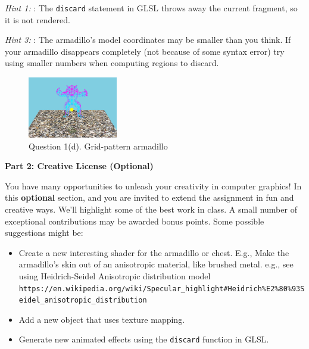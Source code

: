 \documentclass[12pt]{exam}
\begin{document}
\begin{description}
    \textit{Hint 1: }: The {\tt discard} statement in GLSL throws away the current fragment, so
    it is not rendered.
    
    \textit{Hint 3: }: The armadillo's model coordinates may be
    smaller than you think. If your armadillo disappears completely
    (not because of some syntax error) try using smaller numbers when
    computing regions to discard.
    
    \begin{figure}[H]
    \centering
    \includegraphics[width=0.35\textwidth]{./q4.png}
    \caption{Question 1(d). Grid-pattern armadillo \label{fig:gridpattern}}
    \end{figure}

\newpage

\end{description}

\clearpage

{\bf Part 2: Creative License (Optional)}

You have many opportunities to unleash your creativity in
computer graphics!  In this \textbf{optional} section, and you are
invited to extend the assignment in fun and creative ways.
We'll highlight some of the best work in class. A small number of
exceptional contributions may be awarded bonus points.
Some possible suggestions might be:
\begin{itemize}
\item Create a new interesting shader for the armadillo or
  chest. E.g., Make the armadillo's skin out of an anisotropic
  material, like brushed metal. e.g., see using Heidrich-Seidel
  Anisotropic distribution model
  \\
  {\footnotesize
\verb|https://en.wikipedia.org/wiki/Specular_highlight#Heidrich%E2%80%93Seidel_anisotropic_distribution|}

\item Add a new object that uses texture mapping.

\item Generate new animated effects using the {\tt discard} function in GLSL.


\end{itemize}
\end{document}
